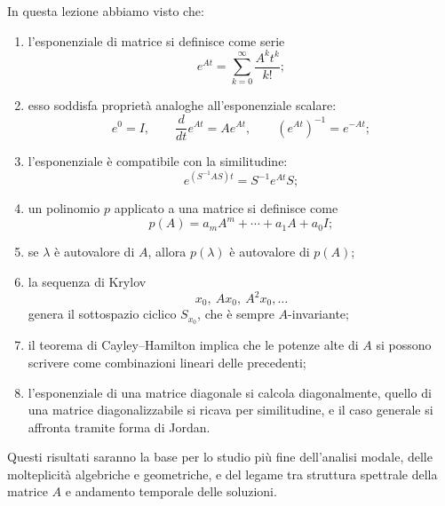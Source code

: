 In questa lezione abbiamo visto che:

\begin{enumerate}
    \item l'esponenziale di matrice si definisce come serie
    \[
    e^{At}=\sum_{k=0}^{\infty}\frac{A^k t^k}{k!};
    \]

    \item esso soddisfa proprietà analoghe all'esponenziale scalare:
    \[
    e^{0}=I,\qquad
    \frac{d}{dt}e^{At}=Ae^{At},\qquad
    (e^{At})^{-1}=e^{-At};
    \]

    \item l'esponenziale è compatibile con la similitudine:
    \[
    e^{(S^{-1}AS)t}=S^{-1}e^{At}S;
    \]

    \item un polinomio $p$ applicato a una matrice si definisce come
    \[
    p(A)=a_mA^m+\cdots+a_1A+a_0I;
    \]

    \item se $\lambda$ è autovalore di $A$, allora $p(\lambda)$ è autovalore di $p(A)$;

    \item la sequenza di Krylov
    \[
    x_0,\ Ax_0,\ A^2x_0,\dots
    \]
    genera il sottospazio ciclico $S_{x_0}$, che è sempre $A$-invariante;

    \item il teorema di Cayley--Hamilton implica che le potenze alte di $A$ si possono scrivere come combinazioni lineari delle precedenti;

    \item l'esponenziale di una matrice diagonale si calcola diagonalmente, quello di una matrice diagonalizzabile si ricava per similitudine, e il caso generale si affronta tramite forma di Jordan.
\end{enumerate}

Questi risultati saranno la base per lo studio più fine dell'analisi modale, delle molteplicità algebriche e geometriche, e del legame tra struttura spettrale della matrice $A$ e andamento temporale delle soluzioni.